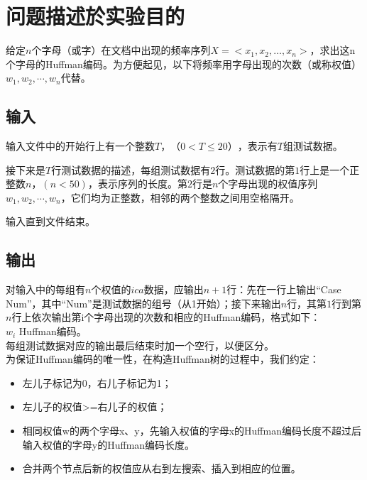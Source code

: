 \documentclass{zjureport}
\begin{document}
\thispagestyle{empty}

\makeCover


\section{问题描述於实验目的}
给定$n$个字母（或字）在文档中出现的频率序列$X=<x_1,x_2,…,x_n>$，求出这n个字母的Huffman编码。为方便起见，以下将频率用字母出现的次数（或称权值）$w_1,w_2,\cdots,w_n$代替。\par
\subsection{输入}
输入文件中的开始行上有一个整数$T$，$（0<T\leqslant20）$，表示有$T$组测试数据。\par
接下来是$T$行测试数据的描述，每组测试数据有$2$行。测试数据的第$1$行上是一个正整数$n$，$(n<50)$，表示序列的长度。第$2$行是$n$个字母出现的权值序列$w_1,w_2,\cdots,w_n$，它们均为正整数，相邻的两个整数之间用空格隔开。\par
输入直到文件结束。\par

\subsection{输出}
对输入中的每组有$n$个权值的$ica$数据，应输出$n+1$行：先在一行上输出“Case Num”，其中“Num”是测试数据的组号（从1开始）；接下来输出$n$行，其第$1$行到第$n$行上依次输出第i个字母出现的次数和相应的Huffman编码，格式如下：\\
$w_i$ Huffman编码。\\
每组测试数据对应的输出最后结束时加一个空行，以便区分。\\
为保证Huffman编码的唯一性，在构造Huffman树的过程中，我们约定：\\
\begin{itemize}
\item 左儿子标记为0，右儿子标记为1；
\item 左儿子的权值>=右儿子的权值；
\item 相同权值w的两个字母x、y，先输入权值的字母x的Huffman编码长度不超过后输入权值的字母y的Huffman编码长度。
\item 合并两个节点后新的权值应从右到左搜索、插入到相应的位置。
\end{itemize}
\end{document}
